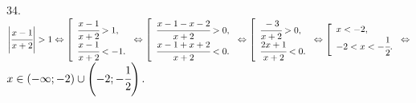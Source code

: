 34. $\left|\cfrac{x-1}{x+2}\right|>1\Leftrightarrow \left[\begin{array}{l} \cfrac{x-1}{x+2}>1,\\ \cfrac{x-1}{x+2}<-1.\end{array}\right.\Leftrightarrow
\left[\begin{array}{l} \cfrac{x-1-x-2}{x+2}>0,\\ \cfrac{x-1+x+2}{x+2}<0.\end{array}\right.\Leftrightarrow
\left[\begin{array}{l} \cfrac{-3}{x+2}>0,\\ \cfrac{2x+1}{x+2}<0.\end{array}\right.\Leftrightarrow
\left[\begin{array}{l} x<-2,\\ -2<x<-\cfrac{1}{2}.\end{array}\right.\Leftrightarrow$\\$
 x\in (-\infty;-2)\cup\left(-2;-\cfrac{1}{2}\right).$\\
